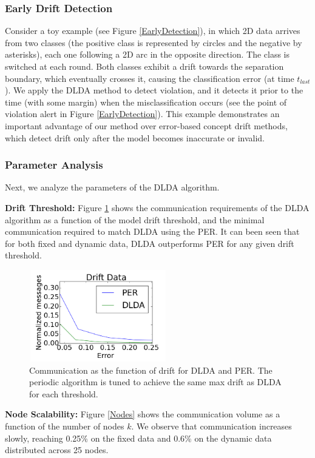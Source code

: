 \subsubsection{Early Drift Detection}\label{sec:earlydetection}
Consider a toy example (see Figure \ref{EarlyDetection}), in which 2D data arrives from two classes (the positive class is represented by circles and the negative by asterisks), each one following a 2D arc in the opposite direction. The class is switched at each round. Both classes exhibit a drift towards the separation boundary, which eventually crosses it, causing the classification error (at time $t_{last}$). We apply the DLDA method to detect violation, and it detects it prior to the time  (with some margin) when the misclassification occurs (see the point of violation alert in Figure \ref{EarlyDetection}). This example demonstrates an important advantage of our method over error-based concept drift methods, which detect drift only after the model becomes inaccurate or invalid.

\subsubsection{Parameter Analysis}\label{sec:paramanal}
Next, we analyze the parameters of the DLDA algorithm.

\noindent\textbf{Drift Threshold:} Figure \ref{PERvsDLDAoverError} shows the communication requirements of the DLDA algorithm as a function of the model drift threshold, and the minimal communication required to match DLDA using the PER.	
It can been seen that for both fixed and dynamic data, DLDA outperforms PER for
any given drift threshold.
 \begin{figure}[ht]
	\centering
	\includegraphics[width=60mm, height=4cm]{PER/onlyDrift.png}
	\caption{Communication as the function of drift for DLDA and PER. The
	periodic algorithm is tuned to achieve the same max drift as DLDA
	for each threshold.}
	\label{PERvsDLDAoverError}
	\end{figure}

	
\noindent\textbf{Node Scalability:}
Figure \ref{Nodes} shows the communication volume as a function of the number of nodes $k$.
We observe that communication increases slowly, reaching 0.25\% on the fixed
data and 0.6\% on the dynamic data distributed across 25 nodes.

